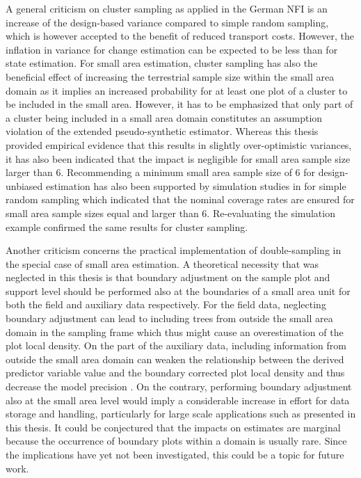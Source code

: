 A general criticism on cluster sampling as applied in the German NFI is an increase of the design-based variance compared to simple random sampling, which is however accepted to the benefit of reduced transport costs. However, the inflation in variance for change estimation can be expected to be less than for state estimation. For small area estimation, cluster sampling has also the beneficial effect of increasing the terrestrial sample size within the small area domain as it implies an increased probability for at least one plot of a cluster to be included in the small area. However, it has to be emphasized that only part of a cluster being included in a small area domain constitutes an assumption violation of the extended pseudo-synthetic estimator. Whereas this thesis provided empirical evidence that this results in slightly over-optimistic variances, it has also been indicated that the impact is negligible for small area sample size larger than 6. Recommending a minimum small area sample size of 6 for design-unbiased estimation has also been supported by simulation studies in \citet{mandallaz2013b} for simple random sampling which indicated that the nominal coverage rates are ensured for small area sample sizes equal and larger than 6. Re-evaluating the simulation example confirmed the same results for cluster sampling.\par 

Another criticism concerns the practical implementation of double-sampling in the special case of small area estimation. A theoretical necessity that was neglected in this thesis is that boundary adjustment on the sample plot and support level should be performed also at the boundaries of a small area unit for both the field and auxiliary data respectively. For the field data, neglecting boundary adjustment can lead to including trees from outside the small area domain in the sampling frame which thus might cause an overestimation of the plot local density. On the part of the auxiliary data, including information from outside the small area domain can weaken the relationship between the derived predictor variable value and the boundary corrected plot local density and thus decrease the model precision \citep{mandallaz2013b}. On the contrary, performing boundary adjustment also at the small area level would imply a considerable increase in effort for data storage and handling, particularly for large scale applications such as presented in this thesis. It could be conjectured that the impacts on estimates are marginal because the occurrence of boundary plots within a domain is usually rare. Since the implications have yet not been investigated, this could be a topic for future work.\par

